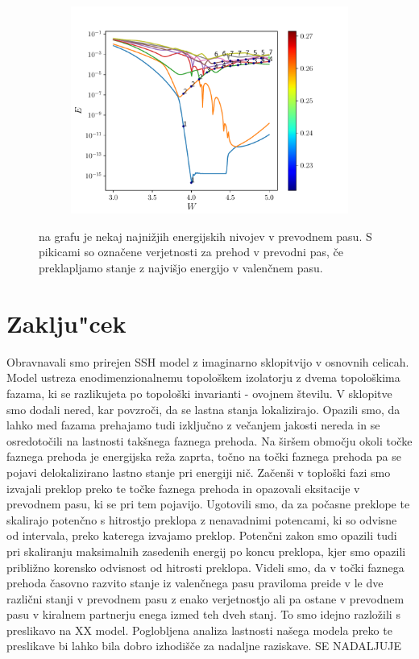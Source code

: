 \begin{figure}[H]
\centering
\begin{subfigure}{\textwidth}
\includegraphics[width=\linewidth]{Figures/IzEngaStanjaWBand.pdf}
\end{subfigure}
\caption{na grafu je nekaj najnižjih energijskih nivojev v prevodnem pasu. S pikicami so označene verjetnosti za prehod v prevodni pas, če preklapljamo stanje z najvišjo energijo v valenčnem pasu.}
\label{fig:IzEngaStanjaWBand}
\end{figure}

%
\chapter{Zaklju"cek}
Obravnavali smo prirejen SSH model z imaginarno sklopitvijo v osnovnih celicah. Model ustreza enodimenzionalnemu topološkem izolatorju z dvema topološkima fazama, ki se razlikujeta po topološki invarianti -  ovojnem številu. V sklopitve smo dodali nered, kar povzroči, da se lastna stanja lokalizirajo. Opazili smo, da lahko med fazama prehajamo tudi izključno z večanjem jakosti nereda in se osredotočili na lastnosti takšnega faznega prehoda. Na širšem območju okoli točke faznega prehoda je energijska reža zaprta, točno na točki faznega prehoda pa se pojavi delokalizirano lastno stanje pri energiji nič.  
Začenši v toploški fazi smo izvajali preklop preko te točke faznega prehoda in opazovali eksitacije v prevodnem pasu, ki se pri tem pojavijo. Ugotovili smo, da za počasne preklope te skalirajo potenčno s hitrostjo preklopa z nenavadnimi potencami, ki so odvisne od intervala, preko katerega izvajamo preklop. Potenčni zakon smo opazili tudi pri skaliranju maksimalnih zasedenih energij po koncu preklopa, kjer smo opazili približno korensko odvisnost od hitrosti preklopa.
Videli smo, da v točki faznega prehoda časovno razvito stanje iz valenčnega pasu praviloma preide v le dve različni stanji v prevodnem pasu z enako verjetnostjo ali pa ostane v prevodnem pasu v kiralnem partnerju enega izmed teh dveh stanj. To smo idejno razložili s preslikavo na XX model. Poglobljena analiza lastnosti našega modela preko te preslikave bi lahko bila dobro izhodišče za nadaljne raziskave. SE NADALJUJE

